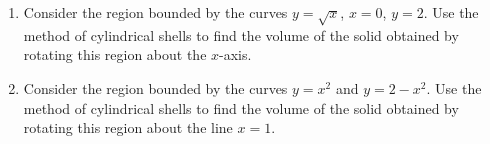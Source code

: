 \begin{enumerate}
\item Consider the region bounded by the curves $y=\sqrt{x}$, $x=0$, $y=2$. Use the method of cylindrical shells to find the volume of
the solid obtained by rotating this region about the $x$-axis. 
\answer{$8\pi$}
\item Consider the region bounded by the curves $y=x^2$ and $y=2-x^2$. Use the method of cylindrical shells to find the volume of the solid obtained by rotating this region about the line $x=1$.
\end{enumerate}
